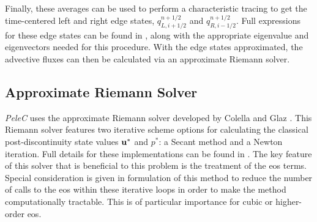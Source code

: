 Finally, these averages can be used to perform a characteristic tracing to get the time-centered left and right edge states, $q_{L, i+1/2}^{n+1/2}$ and $q_{R, i-1/2}^{n+1/2}$. Full expressions for these edge states can be found in \cite{PPM_WENO}, along with the appropriate eigenvalue and eigenvectors needed for this procedure. With the edge states approximated, the advective fluxes can then be calculated via an approximate Riemann solver.


\subsection{Approximate Riemann Solver}
\textit{PeleC} uses the approximate Riemann solver developed by Colella and Glaz \cite{COLELLA1985264}. This Riemann solver features two iterative scheme options for calculating the classical post-discontinuity state values $\vb{u}^*$ and $p^*$: a Secant method and a Newton iteration. Full details for these implementations can be found in \cite{COLELLA1985264}. The key feature of this solver that is beneficial to this problem is the treatment of the \gls{eos} terms. Special consideration is given in formulation of this method to reduce the number of calls to the \gls{eos} within these iterative loops in order to make the method computationally tractable. This is of particular importance for cubic or higher-order \gls{eos}. 


